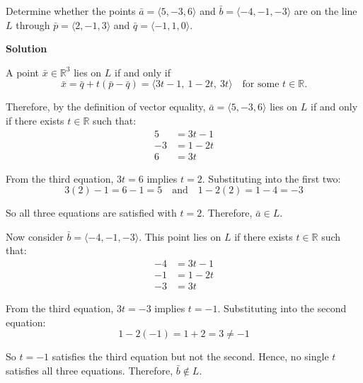 \begin{examplebox}

Determine whether the points 
$\bar{a} = \langle 5, -3, 6 \rangle$ and 
$\bar{b} = \langle -4, -1, -3 \rangle$ are on the line $L$ through
$\bar{p} = \langle 2, -1, 3 \rangle$ and
$\bar{q} = \langle -1, 1, 0 \rangle$.

\vspace{1em}

\textbf{Solution} 

\vspace{1em}
A point $\bar{x} \in \mathbb{R}^3$ lies on $L$ if and only if
\[
\bar{x} = \bar{q} + t(\bar{p} - \bar{q}) = \langle 3t - 1,\ 1 - 2t,\ 3t \rangle \quad \text{for some } t \in \mathbb{R}.
\]

Therefore, by the definition of vector equality, $\bar{a} = \langle 5, -3, 6 \rangle$ lies on $L$ if and only if there exists $t \in \mathbb{R}$ such that:
\[
\begin{aligned}
5 &= 3t - 1 \\
-3 &= 1 - 2t \\
6 &= 3t
\end{aligned}
\]

From the third equation, $3t = 6$ implies $t = 2$. Substituting into the first two:
\[
3(2) - 1 = 6 - 1 = 5 \quad \text{and} \quad 1 - 2(2) = 1 - 4 = -3
\]

So all three equations are satisfied with $t = 2$. Therefore, $\bar{a} \in L$.

Now consider $\bar{b} = \langle -4, -1, -3 \rangle$. This point lies on $L$ if there exists $t \in \mathbb{R}$ such that:
\[
\begin{aligned}
-4 &= 3t - 1 \\
-1 &= 1 - 2t \\
-3 &= 3t
\end{aligned}
\]

From the third equation, $3t = -3$ implies $t = -1$. Substituting into the second equation:
\[
1 - 2(-1) = 1 + 2 = 3 \ne -1
\]

So $t = -1$ satisfies the third equation but not the second. Hence, no single $t$ satisfies all three equations. Therefore, $\bar{b} \notin L$.

\end{examplebox}
